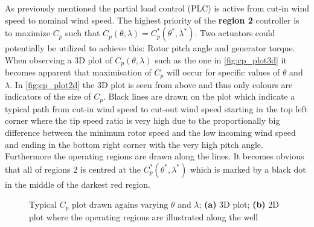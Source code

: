 As previously mentioned the partial load control (PLC) is active from cut-in wind speed to nominal wind speed. The highest priority of the \textbf{region 2} controller is to maximize $ C_p $ such that $ C_p(\theta, \lambda) = C_p^*(\theta^*, \lambda^*) $. Two actuators could potentially be utilized to achieve this: Rotor pitch angle and generator torque. When observing a 3D plot of $ C_p(\theta, \lambda) $ such as the one in \cref{fig:cp_plot3d} it becomes apparent that maximisation of $ C_p $ will occur for specific values of $ \theta $ and $ \lambda $. In \cref{fig:cp_plot2d} the 3D plot is seen from above and thus only colours are indicators of the size of $ C_p $. Black lines are drawn on the plot which indicate a typical path from cut-in wind speed to cut-out wind speed starting in the top left corner where the tip speed ratio is very high due to the proportionally big difference between the minimum rotor speed and the low incoming wind speed and ending in the bottom right corner with the very high pitch angle. Furthermore the operating regions are drawn along the lines. It becomes obvious that all of regions 2 is centred at the $ C_p^*(\theta^*, \lambda^*) $ which is marked by a black dot in the middle of the darkest red region.
\begin{figure}[ht]
	\centering
	
	\hfil
	
	\caption{Typical $ C_p $ plot drawn agains varying $ \theta $ and $ \lambda $; \textbf{(a)} 3D plot; \textbf{(b)} 2D plot where the operating regions are illustrated along the well}
	\label{fig:cp_plot}
\end{figure}

